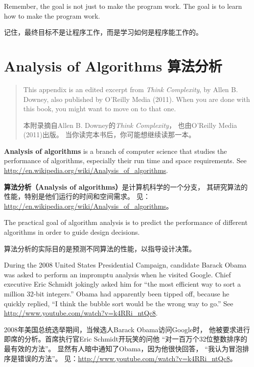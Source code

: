 \documentclass[10pt]{book}
\begin{document}
\begin{CJK}{UTF8}{gbsn}
Remember, the goal is not just to make the program
work.  The goal is to learn how to make the program work.

记住，最终目标不是让程序工作，而是学习如何是程序能工作的。


\chapter{Analysis of Algorithms 算法分析}

\begin{quote}
This appendix is an edited excerpt from {\it Think Complexity}, by
Allen B. Downey, also published by O'Reilly Media (2011).  When you
are done with this book, you might want to move on to that one.

本附录摘自Allen B. Downey的{\it Think Complexity}，
也由O'Reilly Media (2011)出版。
当你读完本书后，你可能想继续读那一本。
\end{quote}

{\bf Analysis of algorithms} is a branch of computer science that
studies the performance of algorithms, especially their run time and
space requirements.  See
\url{http://en.wikipedia.org/wiki/Analysis_of_algorithms}.
 

{\bf 算法分析（Analysis of algorithms）}是计算机科学的一个分支，
其研究算法的性能，特别是他们运行的时间和空间需求。
见：\url{http://en.wikipedia.org/wiki/Analysis_of_algorithms}。

The practical goal of algorithm analysis is to predict the performance
of different algorithms in order to guide design decisions.

算法分析的实际目的是预测不同算法的性能，以指导设计决策。

During the 2008 United States Presidential Campaign, candidate
Barack Obama was asked to perform an impromptu analysis when
he visited Google.  Chief executive Eric Schmidt jokingly asked him
for ``the most efficient way to sort a million 32-bit integers.''
Obama had apparently been tipped off, because he quickly
replied, ``I think the bubble sort would be the wrong way to go.''
See \url{http://www.youtube.com/watch?v=k4RRi_ntQc8}.

2008年美国总统选举期间，当候选人Barack Obama访问Google时，
他被要求进行即席的分析。首席执行官Eric Schmidt开玩笑的问他
``对一百万个32位整数排序的最有效的方法''。
显然有人暗中通知了Obama，因为他很快回答，
``我认为冒泡排序是错误的方法''。
见：\url{http://www.youtube.com/watch?v=k4RRi_ntQc8}。


\end{CJK}
\end{document}
